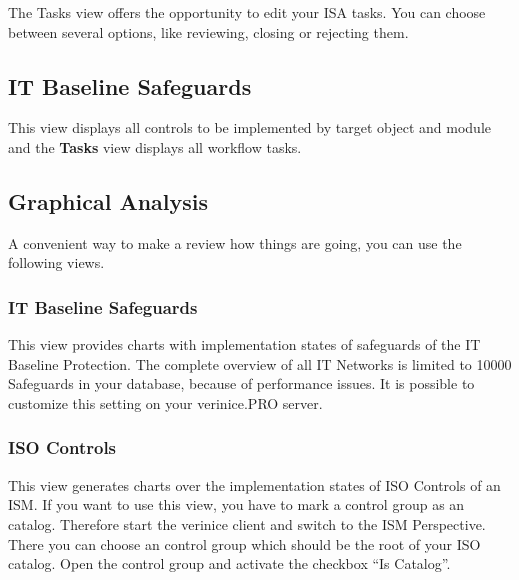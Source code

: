 \documentclass[a4paper,10pt]{book}
\begin{document}
The Tasks view offers the opportunity to edit your ISA tasks. You can
choose between several options, like reviewing, closing or rejecting
them.

\subsection{IT Baseline Safeguards}
\label{sec:it-baseline-safeguards}

This view displays all controls to be implemented by target object and
module and the \textbf{Tasks} view displays all workflow tasks.

\subsection{Graphical Analysis}
\label{sec:graphical-analysis}

A convenient way to make a review how things are going, you can use
the following views.

\subsubsection{IT Baseline Safeguards}
\label{sec:it-baseline-safeguards-charts}

This view provides charts with implementation states of safeguards of
the IT Baseline Protection. The complete overview of
all IT Networks is limited to 10000 Safeguards in your database,
because of performance issues. It is possible to customize this
setting on your verinice.PRO server.

\subsubsection{ISO Controls}
\label{sec:iso-controls}

This view generates charts over the implementation states of ISO
Controls of an ISM. If you want to use this view, you have to mark a
control group as an catalog. Therefore start the verinice client and
switch to the ISM Perspective. There you can choose an control group
which should be the root of your ISO catalog. Open the control group
and activate the checkbox ``Is Catalog''.
\end{document}
